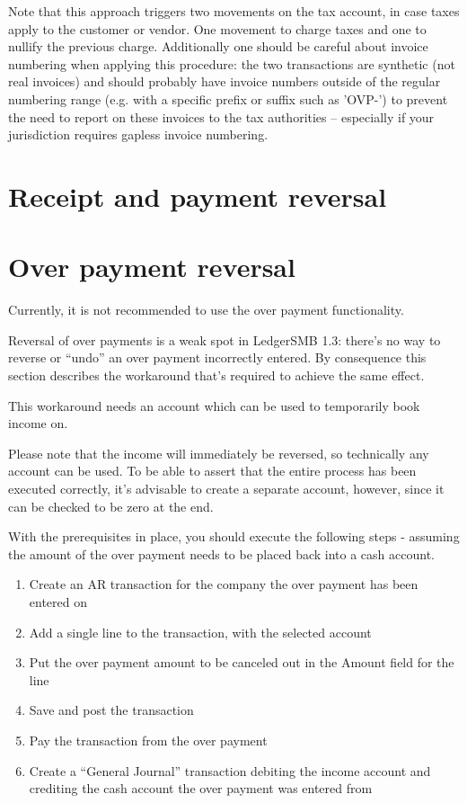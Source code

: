 Note that this approach triggers two movements on the tax account, in case taxes apply to the customer or vendor. One movement to charge taxes and one to nullify the previous charge.  Additionally one should be careful about invoice numbering when applying this procedure: the two transactions are synthetic (not real invoices) and should probably have invoice numbers outside of the regular numbering range (e.g. with a specific prefix or suffix such as 'OVP-') to prevent the need to report on these invoices to the tax authorities -- especially if your jurisdiction requires gapless invoice numbering.


\section{Receipt and payment reversal}
\label{sec-business-processes-payment-processing-reversal}

\section{Over payment reversal}
\label{sec-business-processes-payment-processing-overpayment-reversal}

Currently, it is not recommended to use the over payment functionality.

Reversal of over payments  is a weak spot in LedgerSMB 1.3: there's no way
to reverse or ``undo'' an over payment incorrectly entered.  By consequence
this section describes the workaround that's required to achieve the same
effect.

This workaround needs an account which can be used to temporarily book income on.

Please note that the income will immediately be reversed, so
technically any account can be used.  To be able to assert that the entire process
has been executed correctly, it's advisable to create a separate account, however, since
it can be checked to be zero at the end.

With the prerequisites in place, you should execute the following steps - assuming the amount
of the over payment needs to be placed back into a cash account.

\begin{enumerate}
\item \label{itm:StartSetupOverpaymentCancelation} Create an AR transaction for the
    company the over payment has been entered on
\item Add a single line to the transaction, with the selected account
\item Put the over payment amount to be canceled out in the Amount field for the line
\item \label{itm:EndSetupOverpaymentCancelation} Save and post the transaction
\item \label{itm:OverpaymentCancelation} Pay the transaction from the over payment
\item \label{itm:MoveToCashAccount} Create a ``General Journal'' transaction debiting the income account and crediting the
    cash account the over payment was entered from
\end{enumerate}

